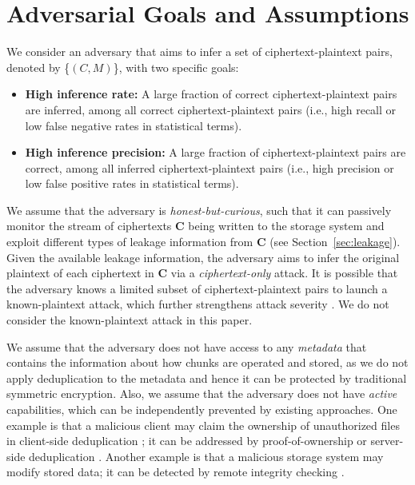 \section{Adversarial Goals and Assumptions}
\label{sec:ThreatModel-Assumptions}

We consider an adversary that aims to infer a set of ciphertext-plaintext
pairs, denoted by \{$(C, M)$\}, with two specific goals:
\begin{itemize}[leftmargin=*]
\item
{\bf High inference rate:} A large fraction of correct ciphertext-plaintext pairs
are inferred, among all correct ciphertext-plaintext pairs (i.e., high recall or
low false negative rates in statistical terms).
\item
{\bf High inference precision:} A large fraction of ciphertext-plaintext pairs
are correct, among all inferred ciphertext-plaintext pairs (i.e., high precision
or low false positive rates in statistical terms).
\end{itemize}
  
We assume that the adversary is {\em honest-but-curious}, such that it can
passively monitor the stream of ciphertexts $\mathbf{C}$ being written to the
storage system and exploit different types of leakage information from
$\mathbf{C}$ (see Section~\ref{sec:leakage}).  Given the available leakage
information, the adversary aims to infer the original plaintext of each
ciphertext in $\mathbf{C}$ via a {\em ciphertext-only} attack.  It is possible
that the adversary knows a limited subset of ciphertext-plaintext pairs to
launch a known-plaintext attack, which further strengthens attack severity
\cite{li17}.  We do not consider the known-plaintext attack in this paper. 


We assume that the adversary does not have access to any {\em metadata} that
contains the information about how chunks are operated and stored, as we do
not apply deduplication to the metadata and hence it can be protected by
traditional symmetric encryption.  Also, we assume that the adversary does not
have {\em active} capabilities, which can be independently prevented by
existing approaches. One example is that a malicious client may claim the
ownership of unauthorized files in client-side deduplication
\cite{harnik10,halevi11,mulazzani11}; it can be addressed by
proof-of-ownership \cite{halevi11,xu13,pietro12} or server-side deduplication
\cite{harnik10,li15}.  Another example is that a malicious storage system may
modify stored data; it can be detected by remote integrity checking
\cite{juels07,ateniese07}. 

